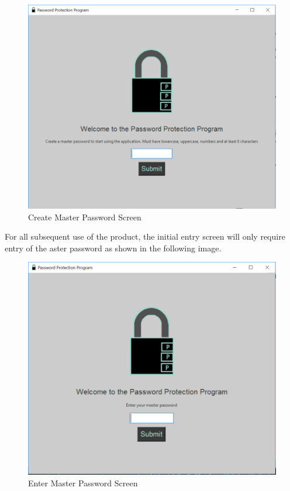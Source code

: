 \documentclass[12pt, titlepage]{article}
\begin{document}
\begin{figure}[h]
	\centering
	\includegraphics[scale=0.7]{images/CreateMasPass.PNG}
	\caption{Create Master Password Screen}
	\label{fig:crMasPass}
\end{figure}

\newpage
For all subsequent use of the product, the initial entry screen will only require entry of the aster password as shown in the following image.

\begin{figure}[h]
	\centering
	\includegraphics[scale=0.7]{images/EnterMasPass.PNG}
	\caption{Enter Master Password Screen}
	\label{fig:enMasPass}
\end{figure}
\end{document}
